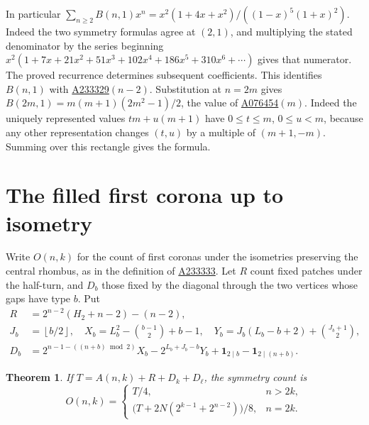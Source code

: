\documentclass[11pt,letterpaper]{article}
\newtheorem{theorem}{Theorem}[section]
\newcommand{\one}{\mathbf 1}
\newcommand{\floor}[1]{\left\lfloor #1\right\rfloor}
\newcommand{\oid}[1]{\href{https://oeis.org/A#1}{A#1}}
\newcommand{\cc}[2]{\binom{#1}{#2}}
\begin{document}
In particular $\sum_{n\ge2} B(n,1)x^n=x^2(1+4x+x^2)/((1-x)^5(1+x)^2)$. Indeed the two symmetry formulas agree at $(2,1)$, and multiplying the stated denominator by the series beginning $x^2(1+7x+21x^2+51x^3+102x^4+186x^5+310x^6+\cdots)$ gives that numerator. The proved recurrence determines subsequent coefficients. This identifies $B(n,1)$ with \oid{233329}$(n-2)$. Substitution at $n=2m$ gives $B(2m,1)=m(m+1)(2m^2-1)/2$, the value of \oid{076454}$(m)$. Indeed the uniquely represented values $tm+u(m+1)$ have $0\le t\le m$, $0\le u<m$, because any other representation changes $(t,u)$ by a multiple of $(m+1,-m)$. Summing over this rectangle gives the formula.

\newpage
\section{The filled first corona up to isometry}
Write $O(n,k)$ for the count of first coronas under the isometries preserving the central rhombus, as in the definition of \oid{233333}. Let $R$ count fixed patches under the half-turn, and $D_b$ those fixed by the diagonal through the two vertices whose gaps have type $b$.  Put
\begin{align*}
 R&=2^{n-2}(H_2+n-2)-(n-2),\\
 J_b&=\floor{b/2},\quad X_b=L_b^2-\cc{b-1}{2}+b-1,\quad
 Y_b=J_b(L_b-b+2)+\cc{J_b+1}{2},\\
 D_b&=2^{n-1-((n+b)\bmod 2)}X_b-2^{L_b+J_b-b}Y_b
              +\one_{2\mid b}-\one_{2\mid(n+b)} .
\end{align*}
\begin{theorem}\label{th:orbits}
If $T=A(n,k)+R+D_k+D_\ell$, the symmetry count is
\[
 O(n,k)=\begin{cases}
 T/4,&n>2k,\\
 \big(T+2N(2^{k-1}+2^{n-2})\big)/8,&n=2k .
 \end{cases}
\]
\end{theorem}
\end{document}
